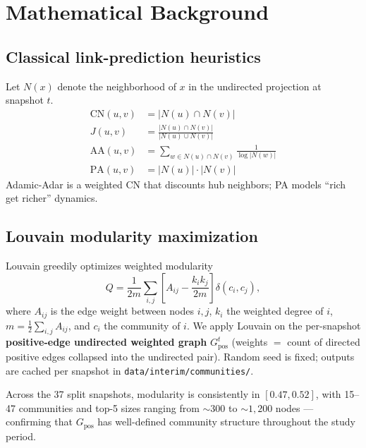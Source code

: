\documentclass[11pt,a4paper]{article}
\newcommand{\code}[1]{\texttt{#1}}
\begin{document}
\section{Mathematical Background}

\subsection{Classical link-prediction heuristics}
Let $N(x)$ denote the neighborhood of $x$ in the undirected projection at
snapshot $t$.
\begin{align*}
\mathrm{CN}(u, v) &= |N(u) \cap N(v)| \\
J(u, v)           &= \frac{|N(u) \cap N(v)|}{|N(u) \cup N(v)|} \\
\mathrm{AA}(u, v) &= \sum_{w \in N(u) \cap N(v)} \frac{1}{\log |N(w)|} \\
\mathrm{PA}(u, v) &= |N(u)| \cdot |N(v)|
\end{align*}
Adamic-Adar \citep{adamic2003} is a weighted CN that discounts hub neighbors;
PA models ``rich get richer'' dynamics.

\subsection{Louvain modularity maximization}
Louvain \citep{blondel2008} greedily optimizes weighted modularity
\begin{equation*}
Q = \frac{1}{2m} \sum_{i, j} \left[ A_{ij}
   - \frac{k_i k_j}{2m} \right] \delta(c_i, c_j),
\end{equation*}
where $A_{ij}$ is the edge weight between nodes $i, j$, $k_i$ the weighted
degree of $i$, $m = \tfrac{1}{2} \sum_{i,j} A_{ij}$, and $c_i$ the community
of $i$. We apply Louvain on the per-snapshot \textbf{positive-edge
undirected weighted graph} $G^t_{\mathrm{pos}}$ (weights $=$ count of directed
positive edges collapsed into the undirected pair). Random seed is fixed;
outputs are cached per snapshot in \code{data/interim/communities/}.

Across the 37 split snapshots, modularity is consistently in
$[0.47, 0.52]$, with 15--47 communities and top-5 sizes ranging from
${\sim}300$ to ${\sim}1{,}200$ nodes --- confirming that $G_{\mathrm{pos}}$ has
well-defined community structure throughout the study period.
\end{document}
